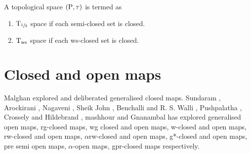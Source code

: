 \begin{dfn}\label{dfn1.3.3} 
A topological space $(\mathrm{P}, \tau)$ is termed as 
\begin{enumerate}[\rm (i)]
\item $\mathrm{T}_{\sfrac{1}{2}}$ space \cite{Malghan} if each semi-closed set is closed. 
\item $\mathrm{T}_{\text{ws}}$ space \cite{Basavaraj} if each ws-closed set is closed. 
\end{enumerate}
\end{dfn}

\section{Closed and open maps}

Malghan \cite{Malghan} explored and deliberated generalised closed maps. Sundaram \cite{Maki2}, Arockirani \cite{Arockiarani}, Nagaveni \cite{Nagaveni}, Sheik John \cite{Sheik1}, Benchalli \cite{Benchalli} and R. S. Walli \cite{Wali2}, Pushpalatha \cite{Pushpalatha}, Crossely and Hildebrand \cite{Crossley}, mashhour \cite{Abd1} and Gnanambal \cite{Gnanambal} has explored generalised open maps, rg-closed maps, wg closed and open maps, w-closed and open maps, rw-closed and open maps, $\alpha$rw-closed and open maps, g*-closed and open maps, pre semi open maps, $\alpha$-open maps, gpr-closed maps respectively.

